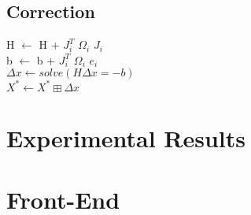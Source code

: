 \documentclass[10pt]{article}
\begin{document}
	\subsection{Correction}
	H $\leftarrow$ H + $J_{\textit{i}}^{T}$ $\Omega_{\textit{i}}$ $J_{\textit{i}}$	\\
	b $\leftarrow$ b + $J_{\textit{i}}^{T}$ $\Omega_{\textit{i}}$ $e_{\textit{i}}$  \\
	$\Delta x \leftarrow solve(H\Delta x=-b)$\\
	$X^* \leftarrow X^* \boxplus \Delta x$
	\section{Experimental Results}	
	\section{Front-End}	
\end{document}
